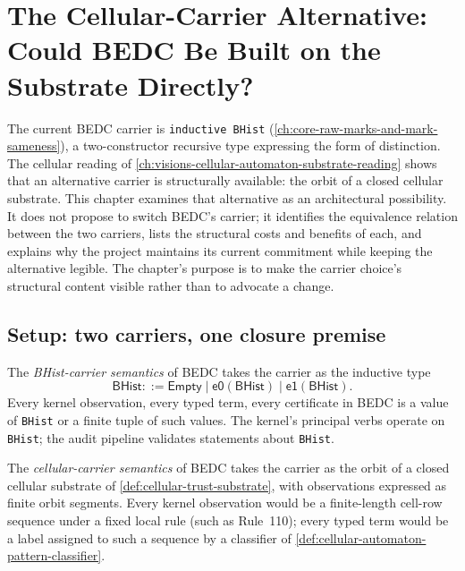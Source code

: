 \chapter{The Cellular-Carrier Alternative: Could BEDC Be Built on the Substrate Directly?}
\label{ch:visions-cellular-substrate-as-carrier-alternative}

The current BEDC carrier is \texttt{inductive BHist} (\autoref{ch:core-raw-marks-and-mark-sameness}), a two-constructor recursive type expressing the form of distinction. The cellular reading of \autoref{ch:visions-cellular-automaton-substrate-reading} shows that an alternative carrier is structurally available: the orbit of a closed cellular substrate. This chapter examines that alternative as an architectural possibility. It does not propose to switch BEDC's carrier; it identifies the equivalence relation between the two carriers, lists the structural costs and benefits of each, and explains why the project maintains its current commitment while keeping the alternative legible. The chapter's purpose is to make the carrier choice's structural content visible rather than to advocate a change.

\section{Setup: two carriers, one closure premise}
\label{sec:cellular-carrier-setup}

\begin{definition}
\label{def:cellular-carrier-bhist-semantics}
The \emph{BHist-carrier semantics} of BEDC takes the carrier as the inductive type
$$
\mathsf{BHist} ::= \mathsf{Empty} \mid \mathsf{e0}(\mathsf{BHist}) \mid \mathsf{e1}(\mathsf{BHist}).
$$
Every kernel observation, every typed term, every certificate in BEDC is a value of \texttt{BHist} or a finite tuple of such values. The kernel's principal verbs operate on \texttt{BHist}; the audit pipeline validates statements about \texttt{BHist}.
\end{definition}

\begin{definition}
\label{def:cellular-carrier-cellular-semantics}
The \emph{cellular-carrier semantics} of BEDC takes the carrier as the orbit of a closed cellular substrate of \autoref{def:cellular-trust-substrate}, with observations expressed as finite orbit segments. Every kernel observation would be a finite-length cell-row sequence under a fixed local rule (such as Rule~110); every typed term would be a label assigned to such a sequence by a classifier of \autoref{def:cellular-automaton-pattern-classifier}.
\end{definition}

